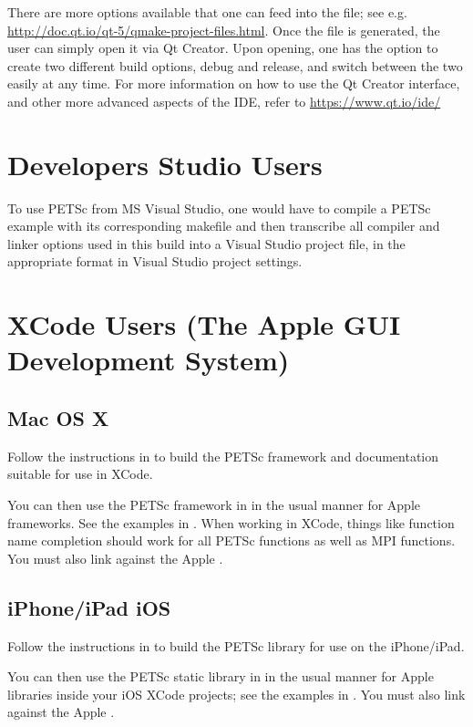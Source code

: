 {{There are more options available that one can feed into the  file; see e.g. \url{http://doc.qt.io/qt-5/qmake-project-files.html}. 
Once the  file is generated, the user can simply open it via Qt Creator. 
Upon opening, one has the option to create two different build options, debug and release, and switch between the two easily at any time. 
For more information on how to use the Qt Creator interface, and other more advanced aspects of the IDE, refer to \url{https://www.qt.io/ide/}

\section{Developers Studio Users} 

To use PETSc from MS Visual Studio, one would have to compile a PETSc example with its corresponding makefile and then transcribe all compiler and linker options used in this build into a Visual Studio project file, in the appropriate format in Visual Studio project settings. 

\section{XCode Users (The Apple GUI Development System)} 
\subsection{Mac OS X}

Follow the instructions in  to build the PETSc framework and documentation suitable for use in XCode.

You can then use the PETSc framework in  in the usual manner for Apple frameworks.
See the examples in .  When working in XCode, things like function name completion should work for all PETSc functions as well as MPI functions. You must also link against the Apple .

\subsection{iPhone/iPad iOS}

Follow the instructions in  to build the PETSc library for use on the iPhone/iPad.

You can then use the PETSc static library in  in the usual manner for Apple libraries inside your iOS XCode projects; see the examples in .  You must also link against the Apple .


}}
